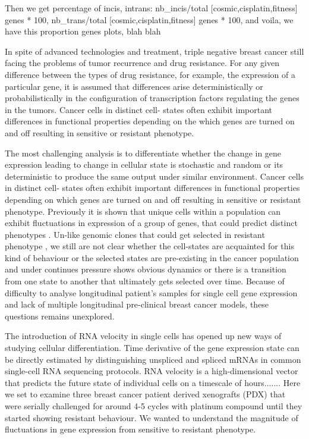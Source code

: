 Then we get percentage of incis, intrans: nb\_incis/total [cosmic,cisplatin,fitness] genes * 100,  nb\_trans/total [cosmic,cisplatin,fitness] genes * 100, and voila, we have this proportion genes plots, blah blah







In spite of advanced technologies and treatment, triple negative breast cancer still facing the problems of tumor recurrence and drug resistance.
For any given difference between the types of drug resistance, for example, the expression of a particular gene, it is assumed that differences arise deterministically or probabilistically in the configuration of transcription factors regulating the genes in the tumors. Cancer cells in distinct cell- states often exhibit important differences in functional properties depending on the which genes are turned on and off resulting in sensitive or resistant phenotype.

The most challenging analysis is to differentiate whether the change in gene expression leading to change in cellular state is stochastic\cite{raj2008nature} and random or its deterministic to produce the same output under similar environment.
Cancer cells in distinct cell- states often exhibit important differences in functional properties depending on which genes are turned on and off resulting in sensitive  or resistant phenotype.
Previously it is shown that unique cells within a population can exhibit fluctuations in expression of a group of genes, that could predict distinct phenotypes \cite{shaffer2019memory}.
Un-like genomic clones that could get selected in resistant phenotype \cite{salehi2020single}, we still are not clear whether the cell-states are acquainted for this kind of behaviour or the selected states are pre-existing in the cancer population and under continues pressure shows obvious dynamics or there is a transition from one state to another that ultimately gets selected over time. Because of difficulty to analyse longitudinal patient's samples for single cell gene expression and lack of multiple longitudinal pre-clinical breast cancer models, these questions remains unexplored.

The introduction of RNA velocity in single cells has opened up new ways of studying cellular differentiation. Time derivative of the gene expression state can be directly estimated by distinguishing unspliced and spliced mRNAs in common single-cell RNA sequencing protocols. RNA velocity is a high-dimensional vector that predicts the future state of individual cells on a timescale of hours.......
Here we set to examine three breast cancer patient derived xenografts (PDX) that were serially challenged for around 4-5 cycles with platinum compound until they started showing resistant behaviour. We wanted to understand the magnitude of fluctuations in gene expression from sensitive to resistant phenotype.


